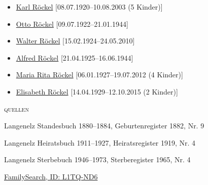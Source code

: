 \begin{person}[
    surname = {Röckel},
    givenname = {Otto},
    suffix = {1882--1965},
    label = {@I15@},
    filename = {Otto Röckel (1882)}
    ]
\begin{itemize}
\item \hyperref[@I70@]{Karl Röckel} [08.07.1920--10.08.2003 (5 Kinder)]
\item \hyperref[@I68@]{Otto Röckel} [09.07.1922--21.01.1944]
\item \hyperref[@I69@]{Walter Röckel} [15.02.1924--24.05.2010]
\item \hyperref[@I71@]{Alfred Röckel} [21.04.1925--16.06.1944]
\item \hyperref[@I12@]{Maria Rita Röckel} [06.01.1927--19.07.2012 (4 Kinder)]
\item \hyperref[@I67@]{Elisabeth Röckel} [14.04.1929--12.10.2015 (2 Kinder)]
\end{itemize}
\medbreak
\textsc{{quellen}}
\begin{enumerate}[label={[\arabic*]}]
\item Langenelz Standesbuch 1880–1884, Geburtenregister 1882, Nr. 9
\item Langenelz Heiratsbuch 1911–1927, Heiratsregister 1919, Nr. 4
\item Langenelz Sterbebuch 1946–1973, Sterberegister 1965, Nr. 4
\item \href{https://www.familysearch.org/tree/person/details/L1TQ-ND6}{FamilySearch, ID: L1TQ-ND6}
\end{enumerate}

\end{person}

